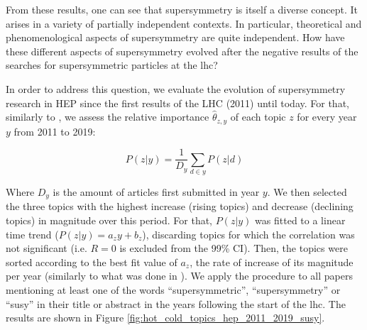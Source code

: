 \documentclass[smallextended]{svjour3}
\begin{document}
From these results, one can see that supersymmetry is itself a diverse concept. It arises in a variety of partially independent contexts. In particular, theoretical and phenomenological aspects of supersymmetry are quite independent. How have these different aspects of supersymmetry evolved after the negative results of the searches for supersymmetric particles at the \gls{lhc}?

In order to address this question, we evaluate the evolution of supersymmetry research in HEP since the first results of the LHC (2011) until today. For that, similarly to \citet{Hall2008}, we assess the relative importance $\hat{\theta}_{z,y}$ of each topic $z$ for every year $y$ from 2011 to 2019:

\begin{equation}
P(z|y) = \dfrac{1}{D_y}\sum_{d\in y} P(z|d)   
\end{equation}

Where $D_y$ is the amount of articles first submitted in year $y$. We then selected the three topics with the highest increase (rising topics) and decrease (declining topics) in magnitude over this period. For that, $P(z|y)$ was fitted to a linear time trend ($P(z|y) = a_zy+b_z$), discarding topics for which the correlation was not significant (i.e. $R=0$ is excluded from the 99\% CI). Then, the topics were sorted according to the best fit value of $a_z$, the rate of increase of its magnitude per year (similarly to what was done in \citealt{Griffiths2004}). We apply the procedure to  all papers mentioning at least one of the words ``supersymmetric'', ``supersymmetry'' or ``susy'' in their title or abstract in the years following the start of the \gls{lhc}. The results are shown in Figure  \ref{fig:hot_cold_topics_hep_2011_2019_susy}. 
\end{document}
